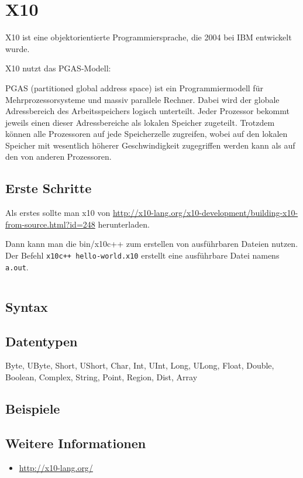 \chapter{X10}%
X10 ist eine objektorientierte Programmiersprache, die 2004 bei IBM entwickelt
wurde.

X10 nutzt das PGAS-Modell:

\begin{definition}%
    PGAS (partitioned global address space) ist ein Programmiermodell für 
    Mehrprozessorsysteme und massiv parallele Rechner. Dabei wird der globale 
    Adressbereich des Arbeitsspeichers logisch unterteilt. Jeder Prozessor 
    bekommt jeweils einen dieser Adressbereiche als lokalen Speicher zugeteilt. 
    Trotzdem können alle Prozessoren auf jede Speicherzelle zugreifen, wobei auf 
    den lokalen Speicher mit wesentlich höherer Geschwindigkeit zugegriffen 
    werden kann als auf den von anderen Prozessoren.
\end{definition}

\section{Erste Schritte}
Als erstes sollte man x10 von \url{http://x10-lang.org/x10-development/building-x10-from-source.html?id=248} herunterladen.

Dann kann man die bin/x10c++ zum erstellen von ausführbaren Dateien nutzen.
Der Befehl \texttt{x10c++ hello-world.x10} erstellt eine ausführbare Datei namens
\texttt{a.out}.

\inputminted[numbersep=5pt, tabsize=4, frame=lines, label=hello-world.x10]{cpp}{scripts/x10/hello-world.x10}

\section{Syntax}
\section{Datentypen}
Byte, UByte, Short, UShort, Char, Int, UInt, Long, ULong, Float, Double, Boolean, Complex, String, Point, Region, Dist, Array

\section{Beispiele}

\section{Weitere Informationen}
\begin{itemize}
    \item \url{http://x10-lang.org/}
\end{itemize}
